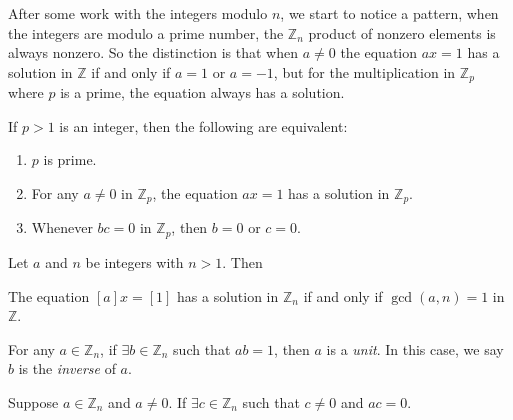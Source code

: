 \documentclass[../main.tex]{subfiles}
\begin{document}
\begin{remark}
After some work with the integers modulo $n$, we start to notice a pattern, when the integers are modulo a prime number, the $\mathbb{Z}_n$ product of nonzero elements is always nonzero. So the distinction is that when $a\neq0$ the equation $ax = 1$ has a solution in $ \mathbb{Z}$ if and only if $ a = 1$ or $ a = -1$, but for the multiplication in $\mathbb{Z}_p $ where $p$ is a prime, the equation always has a solution. 
\end{remark}



\begin{theorem}
If $p > 1$ is an integer, then the following are equivalent:
\begin{enumerate}
    \item $p$ is prime.
    \item For any $a \neq 0$ in $\mathbb{Z}_p$, the equation $ax = 1$ has a solution in $\mathbb{Z}_p$.
    \item Whenever $bc = 0$ in $\mathbb{Z}_p$, then $b = 0$ or $c = 0$.
\end{enumerate}
\end{theorem}






\begin{corollary}
Let $a$ and $n$ be integers with $n > 1$. Then

The equation $[a]x = [1]$ has a solution in $\mathbb{Z}_n$ if and only if $\gcd(a, n) = 1$ in $\mathbb{Z}$.
\end{corollary}


\begin{definition}[Units]\label{def:units}
For any $ a \in \mathbb{Z}_n$, if $ \exists b \in \mathbb{Z}_n$ such that $ab = 1$, then $a$ is a \textit{unit}. In this case, we say $b$ is the \textit{inverse} of $a$.
\end{definition}

\begin{definition}\label{def:zero_divisor}
Suppose $a \in \mathbb{Z}_n$ and $ a \neq 0$. If  $ \exists c \in \mathbb{Z}_n$ such that $c \neq 0$ and $ac = 0$.
\end{definition}
\end{document}
